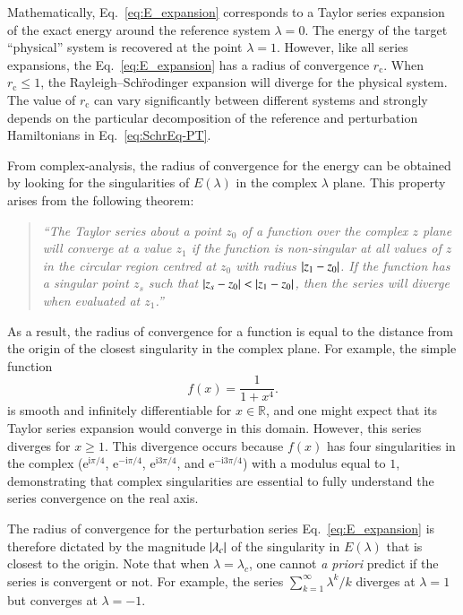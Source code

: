 \documentclass[aps,prb,reprint,noshowkeys,linenumbers,superscriptaddress]{revtex4-1}
\renewcommand{\i}{\mathrm{i}} %
\newcommand{\e}{\mathrm{e}} %
\newcommand{\rc}{r_{\text{c}}}
\begin{document}
Mathematically, Eq.~\eqref{eq:E_expansion} corresponds to a Taylor series expansion of the exact energy
around the reference system $\lambda = 0$.
The energy of the target ``physical'' system is recovered at the point $\lambda = 1$.
However, like all series expansions, the Eq.~\eqref{eq:E_expansion} has a radius of convergence $\rc$. 
When $\rc \le 1$, the Rayleigh--Sch\"{r}odinger expansion will diverge
for the physical system.
The value of $\rc$ can vary significantly between different systems and strongly depends on the particular decomposition
of the reference and perturbation Hamiltonians in Eq.~\eqref{eq:SchrEq-PT}.\cite{Mihalka_2017b}

From complex-analysis, \cite{BenderBook} the radius of convergence for the energy can be obtained by looking for the 
singularities of $E(\lambda)$ in the complex $\lambda$ plane.
This property arises from the following theorem: \cite{Goodson_2011}
\begin{quote}
\it
``The Taylor series about a point $z_0$ of a function over the complex $z$ plane will converge at a value $z_1$ 
if the function is non-singular at all values of $z$ in the circular region centred at $z_0$ with radius $\abs{z_1-z_0}$. 
If the function has a singular point $z_s$ such that $\abs{z_s-z_0} < \abs{z_1-z_0}$, 
then the series will diverge when evaluated at $z_1$.''
\end{quote}
As a result, the radius of convergence for a function is equal to the distance from the origin of the closest singularity
in the complex plane.
For example, the simple function
\begin{equation} \label{eq:DivExample}
	f(x)=\frac{1}{1+x^4}.
\end{equation}
is smooth and infinitely differentiable for $x \in \mathbb{R}$, and one might expect that its Taylor series expansion would 
converge in this domain.
However, this series diverges for $x \ge 1$.
This divergence occurs because $f(x)$ has four singularities in the complex 
($\e^{\i\pi/4}$, $\e^{-\i\pi/4}$, $\e^{\i3\pi/4}$, and $\e^{-\i3\pi/4}$) with a modulus equal to $1$, demonstrating
that complex singularities are essential to fully understand the series convergence on the real axis.\cite{BenderBook}

The radius of convergence for the perturbation series Eq.~\eqref{eq:E_expansion} is therefore dictated by the magnitude $\abs{\lambda_c}$ of the
singularity in $E(\lambda)$ that is closest to the origin.
Note that when $\lambda = \lambda_c$, one cannot \textit{a priori} predict if the series is convergent or not.
For example, the series $\sum_{k=1}^\infty \lambda^k/k$ diverges at $\lambda = 1$ but converges at $\lambda = -1$.
\end{document}
